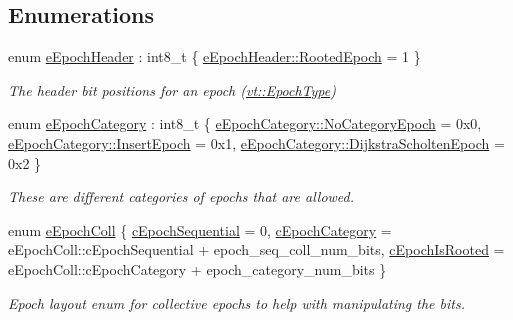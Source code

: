 \subsection*{Enumerations}
\begin{DoxyCompactItemize}
\item 
enum \hyperlink{namespacevt_1_1epoch_a8cbcd2bf5d3ce987837869c26a1d00ad}{e\+Epoch\+Header} \+: int8\+\_\+t \{ \hyperlink{namespacevt_1_1epoch_a8cbcd2bf5d3ce987837869c26a1d00ada4bbf8ef3641b58f81dc5320f32df0178}{e\+Epoch\+Header\+::\+Rooted\+Epoch} = 1
 \}\begin{DoxyCompactList}\small\item\em The header bit positions for an epoch ({\ttfamily \hyperlink{namespacevt_a81d11b28122d43bf9834577e4a06440f}{vt\+::\+Epoch\+Type}}) \end{DoxyCompactList}
\item 
enum \hyperlink{namespacevt_1_1epoch_a956abe0aceef0d10a988de8acb002c7c}{e\+Epoch\+Category} \+: int8\+\_\+t \{ \hyperlink{namespacevt_1_1epoch_a956abe0aceef0d10a988de8acb002c7caa6136714a068313660a40ae6bd15410c}{e\+Epoch\+Category\+::\+No\+Category\+Epoch} = 0x0, 
\hyperlink{namespacevt_1_1epoch_a956abe0aceef0d10a988de8acb002c7cae357e225fcb0ad22e8152c68f4d9829f}{e\+Epoch\+Category\+::\+Insert\+Epoch} = 0x1, 
\hyperlink{namespacevt_1_1epoch_a956abe0aceef0d10a988de8acb002c7ca317c96e0b9f3b6871d4832a7f9e31e9f}{e\+Epoch\+Category\+::\+Dijkstra\+Scholten\+Epoch} = 0x2
 \}\begin{DoxyCompactList}\small\item\em These are different categories of epochs that are allowed. \end{DoxyCompactList}
\item 
enum \hyperlink{namespacevt_1_1epoch_aff6d7581e1d2888909564a5deaaf11a9}{e\+Epoch\+Coll} \{ \hyperlink{namespacevt_1_1epoch_aff6d7581e1d2888909564a5deaaf11a9abbdc913c0a12f5a5617e1146a11f5fb5}{c\+Epoch\+Sequential} = 0, 
\hyperlink{namespacevt_1_1epoch_aff6d7581e1d2888909564a5deaaf11a9ac42416b5e5a9257c76fb7a691c7d79be}{c\+Epoch\+Category} = e\+Epoch\+Coll\+:\+:c\+Epoch\+Sequential + epoch\+\_\+seq\+\_\+coll\+\_\+num\+\_\+bits, 
\hyperlink{namespacevt_1_1epoch_aff6d7581e1d2888909564a5deaaf11a9a87c678c589ab0fbaf738353c3d9ea9d5}{c\+Epoch\+Is\+Rooted} = e\+Epoch\+Coll\+:\+:c\+Epoch\+Category + epoch\+\_\+category\+\_\+num\+\_\+bits
 \}\begin{DoxyCompactList}\small\item\em Epoch layout enum for collective epochs to help with manipulating the bits. \end{DoxyCompactList}

\end{DoxyCompactItemize}
